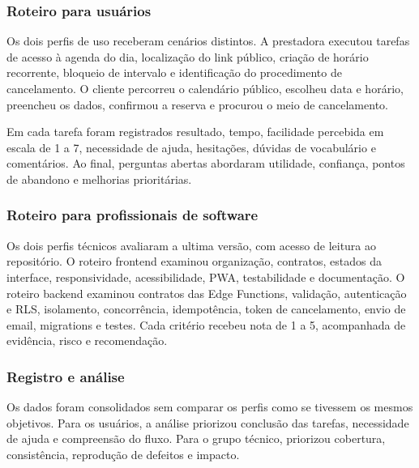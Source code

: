 \subsubsection{Roteiro para usuários}

Os dois perfis de uso receberam cenários distintos. A prestadora executou tarefas de acesso à agenda do dia, localização do link público, criação de horário recorrente, bloqueio de intervalo e identificação do procedimento de cancelamento. O cliente percorreu o calendário público, escolheu data e horário, preencheu os dados, confirmou a reserva e procurou o meio de cancelamento.

Em cada tarefa foram registrados resultado, tempo, facilidade percebida em escala de 1 a 7, necessidade de ajuda, hesitações, dúvidas de vocabulário e comentários. Ao final, perguntas abertas abordaram utilidade, confiança, pontos de abandono e melhorias prioritárias.

\subsubsection{Roteiro para profissionais de software}

Os dois perfis técnicos avaliaram a ultima versão, com acesso de leitura ao repositório. O roteiro frontend examinou organização, contratos, estados da interface, responsividade, acessibilidade, PWA, testabilidade e documentação. O roteiro backend examinou contratos das Edge Functions, validação, autenticação e RLS, isolamento, concorrência, idempotência, token de cancelamento, envio de email, migrations e testes. Cada critério recebeu nota de 1 a 5, acompanhada de evidência, risco e recomendação.

\subsubsection{Registro e análise}

Os dados foram consolidados sem comparar os perfis como se tivessem os mesmos objetivos. Para os usuários, a análise priorizou conclusão das tarefas, necessidade de ajuda e compreensão do fluxo. Para o grupo técnico, priorizou cobertura, consistência, reprodução de defeitos e impacto.

